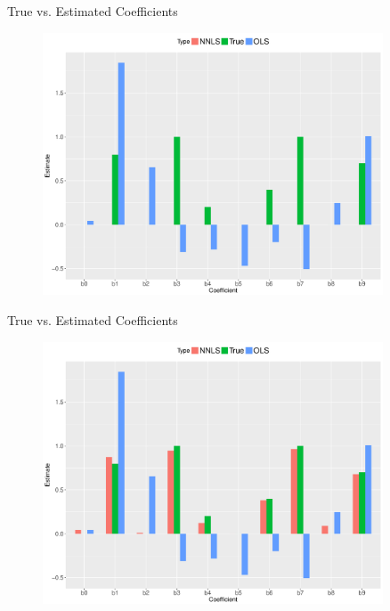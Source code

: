 \documentclass{beamer}
\begin{document}
\begin{frame}{True vs. Estimated Coefficients}
	\vfill
	\begin{figure}
		\includegraphics[width=0.9\textwidth]{figs/nnls1.pdf}
	\end{figure}
	\vfill
\end{frame}

\begin{frame}{True vs. Estimated Coefficients}
	\vfill
	\begin{figure}
		\includegraphics[width=0.9\textwidth]{figs/nnls2.pdf}
	\end{figure}
	\vfill
\end{frame}
\end{document}
